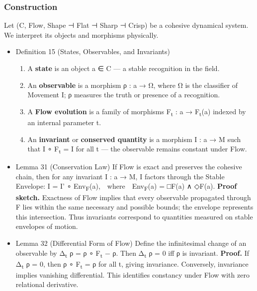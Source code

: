 \documentclass[11pt]{article}
\begin{document}
\subsubsection*{Construction}
\label{sec:org5a539ae}
Let (C, Flow, Shape ⊣ Flat ⊣ Sharp ⊣ Crisp) be a cohesive dynamical system.  
We interpret its objects and morphisms physically.
\begin{itemize}
\item Definition 15 (States, Observables, and Invariants)
\label{sec:org539583c}
\begin{enumerate}
\item A \textbf{state} is an object a ∈ C — a stable recognition in the field.
\item An \textbf{observable} is a morphism  ρ : a → Ω,  
where Ω is the classifier of Movement I; ρ measures the truth or presence of a recognition.
\item A \textbf{Flow evolution} is a family of morphisms  F\textsubscript{t} : a → F\textsubscript{t}(a)  indexed by an internal parameter t.
\item An \textbf{invariant} or \textbf{conserved quantity} is a morphism  I : a → M  
such that I ∘ F\textsubscript{t} = I for all t — the observable remains constant under Flow.
\end{enumerate}
\item Lemma 31 (Conservation Law)
\label{sec:orgfd99d5a}
If Flow is exact and preserves the cohesive chain,  
then for any invariant I : a → M,  
I factors through the Stable Envelope:  
I = I' ∘ Env\textsubscript{F}(a), where Env\textsubscript{F}(a) = □F(a) ∧ ◇F(a).  
\textbf{Proof sketch.}  
Exactness of Flow implies that every observable propagated through F lies within the same necessary and possible bounds;  
the envelope represents this intersection.  
Thus invariants correspond to quantities measured on stable envelopes of motion.
\item Lemma 32 (Differential Form of Flow)
\label{sec:org0fc7279}
Define the infinitesimal change of an observable by  
Δ\textsubscript{t} ρ = ρ ∘ F\textsubscript{t} − ρ.  
Then  Δ\textsubscript{t} ρ = 0  iff  ρ  is invariant.  
\textbf{Proof.}  
If Δ\textsubscript{t} ρ = 0,  then ρ ∘ F\textsubscript{t} = ρ for all t, giving invariance.  
Conversely, invariance implies vanishing differential.  
This identifies constancy under Flow with zero relational derivative.
\end{itemize}
\end{document}
